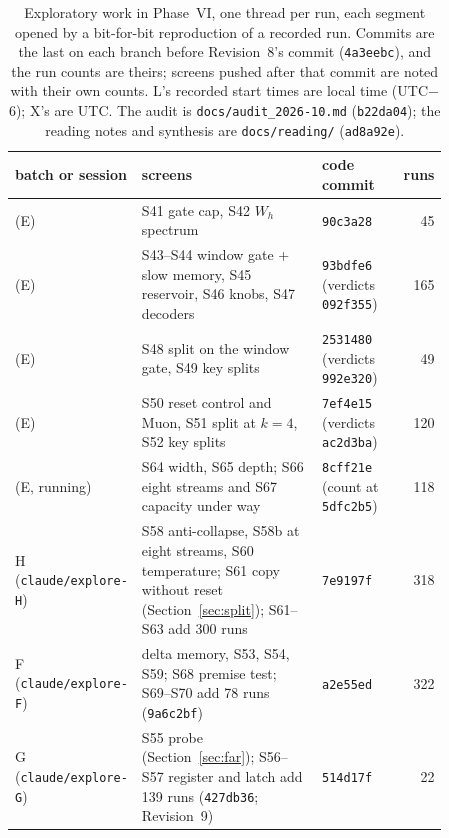 \documentclass[11pt]{article}
\begin{document}
\begin{table}[H]
\centering
\footnotesize
\begin{tabular}{@{}>{\raggedright\arraybackslash}p{0.2\linewidth}>{\raggedright\arraybackslash}p{0.46\linewidth}>{\raggedright\arraybackslash}p{0.2\linewidth}r@{}}
\toprule
batch or session & screens & code commit & runs\\
\midrule
15 (E) & S41 gate cap, S42 $W_h$ spectrum & \texttt{90c3a28} & 45\\
16 (E) & S43--S44 window gate + slow memory, S45 reservoir, S46 knobs, S47 decoders & \texttt{93bdfe6} (verdicts \texttt{092f355}) & 165\\
17 (E) & S48 split on the window gate, S49 key splits & \texttt{2531480} (verdicts \texttt{992e320}) & 49\\
18 (E) & S50 reset control and Muon, S51 split at $k{=}4$, S52 key splits & \texttt{7ef4e15} (verdicts \texttt{ac2d3ba}) & 120\\
19 (E, running) & S64 width, S65 depth; S66 eight streams and S67 capacity under way & \texttt{8cff21e} (count at \texttt{5dfc2b5}) & 118\\
H (\texttt{claude/explore-H}) & S58 anti-collapse, S58b at eight streams, S60 temperature; S61 copy without reset (Section~\ref{sec:split}); S61--S63 add 300 runs & \texttt{7e9197f} & 318\\
F (\texttt{claude/explore-F}) & delta memory, S53, S54, S59; S68 premise test; S69--S70 add 78 runs (\texttt{9a6c2bf}) & \texttt{a2e55ed} & 322\\
G (\texttt{claude/explore-G}) & S55 probe (Section~\ref{sec:far}); S56--S57 register and latch add 139 runs (\texttt{427db36}; Revision~9) & \texttt{514d17f} & 22\\
\bottomrule
\end{tabular}
\caption{Exploratory work in Phase~VI, one thread per run, each segment opened by a bit-for-bit reproduction of a recorded run. Commits are the last on each branch before Revision~8's commit (\texttt{4a3eebc}), and the run counts are theirs; screens pushed after that commit are noted with their own counts. L's recorded start times are local time (UTC$-$6); X's are UTC. The audit is \texttt{docs/audit\_2026-10.md} (\texttt{b22da04}); the reading notes and synthesis are \texttt{docs/reading/} (\texttt{ad8a92e}).}
\label{tab:batches}
\end{table}
\end{document}
